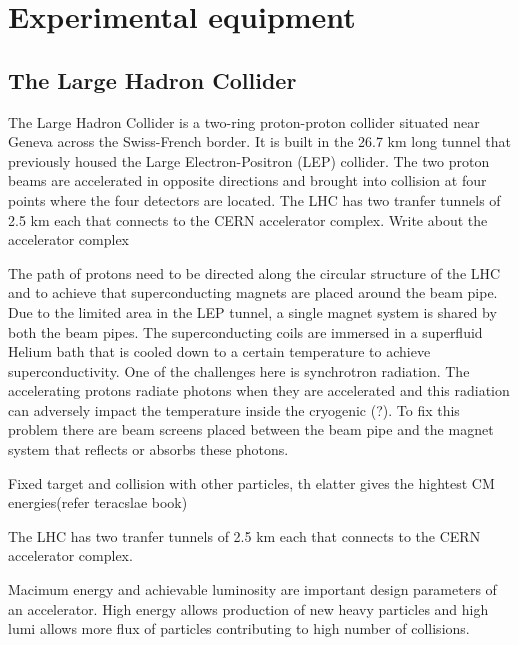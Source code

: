
\chapter{Experimental equipment}
\label{sec:LHCATLAS}

\section{The Large Hadron Collider}
The Large Hadron Collider is a two-ring proton-proton collider situated near Geneva across the Swiss-French border. It is built in the 26.7 km long tunnel 
that previously housed the Large Electron-Positron (LEP) collider. The two proton beams are accelerated in opposite directions and brought into collision at 
four points where the four detectors are located. The LHC has two tranfer tunnels of 2.5 km each that connects to the CERN accelerator complex. 
Write about the accelerator complex


The path of protons need to be directed along the circular structure of the LHC and to achieve that 
superconducting magnets are placed around the beam pipe. Due to the limited area in the LEP tunnel, a single magnet system is shared by both the beam pipes.
The superconducting coils are immersed in a superfluid Helium bath that is cooled down to a certain temperature to achieve superconductivity. One of the 
challenges here is synchrotron radiation. The accelerating protons radiate photons when they are accelerated and this radiation can adversely impact the 
temperature inside the cryogenic (?). To fix this problem there are beam screens placed between the beam pipe and the magnet system that reflects or absorbs 
these photons. 



Fixed target and collision with other particles, th elatter gives the hightest CM energies(refer teracslae book)

The LHC has two tranfer tunnels of 2.5 km each that connects to the CERN accelerator complex. 

Macimum energy and achievable luminosity are important design parameters of an accelerator. High energy allows production of new heavy particles and high 
lumi allows more flux of particles contributing to high number of collisions.